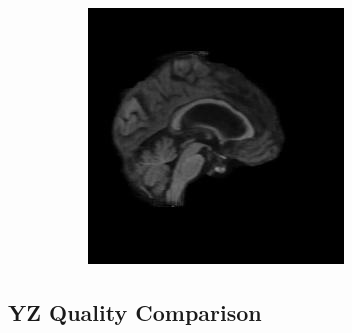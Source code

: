 \documentclass[12pt, fleqn, titlepage]{article}
\newcommand\skipper{1.4pt}
\begin{document}
\begin{figure}[H]
\begin{subfigure}[b]{0.7\textwidth}
		\hskip\skipper
		\includegraphics[width=0.22\linewidth]{imgs/082_S_0469/XZ_model_082_S_0469_yz_3}
	\end{subfigure}
\end{figure}

\subsection{YZ Quality Comparison}\label{yz_generated}
\end{document}

